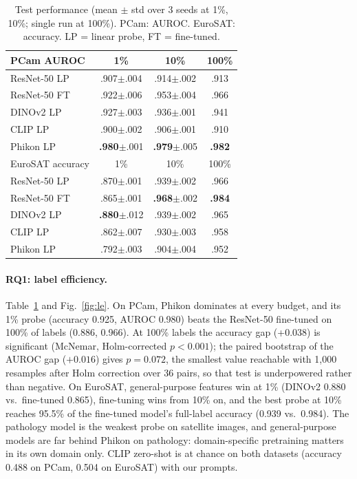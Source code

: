 \documentclass[10pt,twocolumn]{article}
\begin{document}
\begin{table}[t]
\centering\small
\caption{Test performance (mean $\pm$ std over 3 seeds at 1\%, 10\%; single run at 100\%).
PCam: AUROC. EuroSAT: accuracy. LP = linear probe, FT = fine-tuned.}
\label{tab:main}
\begin{tabular}{@{}lccc@{}}
\toprule
PCam AUROC & 1\% & 10\% & 100\% \\
\midrule
ResNet-50 LP & .907$\pm$.004 & .914$\pm$.002 & .913 \\
ResNet-50 FT & .922$\pm$.006 & .953$\pm$.004 & .966 \\
DINOv2 LP & .927$\pm$.003 & .936$\pm$.001 & .941 \\
CLIP LP & .900$\pm$.002 & .906$\pm$.001 & .910 \\
Phikon LP & \textbf{.980}$\pm$.001 & \textbf{.979}$\pm$.005 & \textbf{.982} \\
\midrule
EuroSAT accuracy & 1\% & 10\% & 100\% \\
\midrule
ResNet-50 LP & .870$\pm$.001 & .939$\pm$.002 & .966 \\
ResNet-50 FT & .865$\pm$.001 & \textbf{.968}$\pm$.002 & \textbf{.984} \\
DINOv2 LP & \textbf{.880}$\pm$.012 & .939$\pm$.002 & .965 \\
CLIP LP & .862$\pm$.007 & .930$\pm$.003 & .958 \\
Phikon LP & .792$\pm$.003 & .904$\pm$.004 & .952 \\
\bottomrule
\end{tabular}
\end{table}

\paragraph{RQ1: label efficiency.} Table~\ref{tab:main} and Fig.~\ref{fig:le}. On PCam, Phikon
dominates at every budget, and its 1\% probe (accuracy 0.925, AUROC 0.980) beats the ResNet-50
fine-tuned on 100\% of labels (0.886, 0.966). At 100\% labels the accuracy gap (+0.038) is
significant (McNemar, Holm-corrected $p<0.001$); the paired bootstrap of the AUROC gap
($+0.016$) gives $p=0.072$, the smallest value reachable with 1,000 resamples after Holm
correction over 36 pairs, so that test is underpowered rather than negative. On EuroSAT,
general-purpose features win at 1\% (DINOv2 0.880 vs.\ fine-tuned 0.865), fine-tuning wins from
10\% on, and the best probe at 10\% reaches 95.5\% of the fine-tuned model's full-label
accuracy (0.939 vs.\ 0.984). The pathology model is the weakest probe on satellite images, and
general-purpose models are far behind Phikon on pathology: domain-specific pretraining matters
in its own domain only. CLIP zero-shot is at chance on both datasets (accuracy 0.488 on PCam,
0.504 on EuroSAT) with our prompts.
\end{document}
